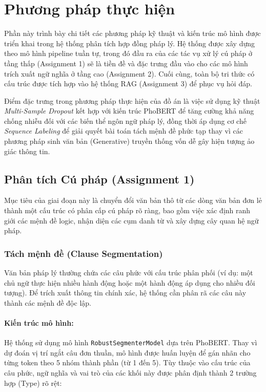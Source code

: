 \section{Phương pháp thực hiện}

Phần này trình bày chi tiết các phương pháp kỹ thuật và kiến trúc mô hình được triển khai trong hệ thống phân tích hợp đồng pháp lý. Hệ thống được xây dựng theo mô hình pipeline tuần tự, trong đó đầu ra của các tác vụ xử lý cú pháp ở tầng thấp (Assignment 1) sẽ là tiền đề và đặc trưng đầu vào cho các mô hình trích xuất ngữ nghĩa ở tầng cao (Assignment 2). Cuối cùng, toàn bộ tri thức có cấu trúc được tích hợp vào hệ thống RAG (Assignment 3) để phục vụ hỏi đáp.

Điểm đặc trưng trong phương pháp thực hiện của đồ án là việc sử dụng kỹ thuật \textit{Multi-Sample Dropout} \autocite{multidrop} kết hợp với kiến trúc PhoBERT để tăng cường khả năng chống nhiễu đối với các biến thể ngôn ngữ pháp lý, đồng thời áp dụng cơ chế \textit{Sequence Labeling} để giải quyết bài toán tách mệnh đề phức tạp thay vì các phương pháp sinh văn bản (Generative) truyền thống vốn dễ gây hiện tượng ảo giác thông tin.

\subsection{Phân tích Cú pháp (Assignment 1)}

Mục tiêu của giai đoạn này là chuyển đổi văn bản thô từ các dòng văn bản đơn lẻ thành một cấu trúc có phân cấp cú pháp rõ ràng, bao gồm việc xác định ranh giới các mệnh đề logic, nhận diện các cụm danh từ và xây dựng cây quan hệ ngữ pháp.

\subsubsection{Tách mệnh đề (Clause Segmentation)}

Văn bản pháp lý thường chứa các câu phức với cấu trúc phân phối (ví dụ: một chủ ngữ thực hiện nhiều hành động hoặc một hành động áp dụng cho nhiều đối tượng). Để trích xuất thông tin chính xác, hệ thống cần phân rã các câu này thành các mệnh đề độc lập.

\paragraph{Kiến trúc mô hình:}
Hệ thống sử dụng mô hình \texttt{RobustSegmenterModel} dựa trên PhoBERT. Thay vì dự đoán vị trí ngắt câu đơn thuần, mô hình được huấn luyện để gán nhãn cho từng token theo 5 nhóm thành phần (từ 1 đến 5). Tùy thuộc vào cấu trúc của câu phức, ngữ nghĩa và vai trò của các khối này được phân định thành 2 trường hợp (Type) rõ rệt:

